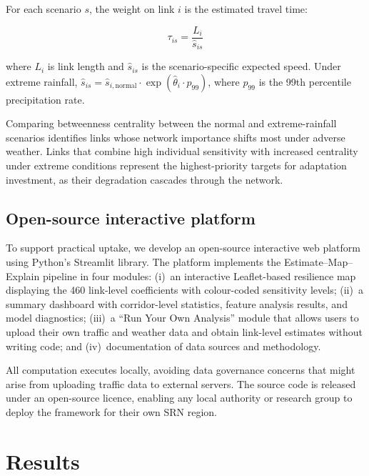 \documentclass[review]{elsarticle}
\begin{document}
For each scenario $s$, the weight on link $i$ is the estimated travel time:

\begin{equation}
\label{eq:traveltime}
\tau_{is} = \frac{L_i}{\hat{s}_{is}}
\end{equation}

\noindent where $L_i$ is link length and $\hat{s}_{is}$ is the scenario-specific expected speed. Under extreme rainfall, $\hat{s}_{is} = \hat{s}_{i,\text{normal}} \cdot \exp(\hat{\theta}_i \cdot p_{99})$, where $p_{99}$ is the 99th percentile precipitation rate.

Comparing betweenness centrality between the normal and extreme-rainfall scenarios identifies links whose network importance shifts most under adverse weather. Links that combine high individual sensitivity with increased centrality under extreme conditions represent the highest-priority targets for adaptation investment, as their degradation cascades through the network.


\subsection{Open-source interactive platform}
\label{sec:method:platform}

To support practical uptake, we develop an open-source interactive web platform using Python's Streamlit library. The platform implements the Estimate--Map--Explain pipeline in four modules: (i)~an interactive Leaflet-based resilience map displaying the 460 link-level coefficients with colour-coded sensitivity levels; (ii)~a summary dashboard with corridor-level statistics, feature analysis results, and model diagnostics; (iii)~a ``Run Your Own Analysis'' module that allows users to upload their own traffic and weather data and obtain link-level estimates without writing code; and (iv)~documentation of data sources and methodology.

All computation executes locally, avoiding data governance concerns that might arise from uploading traffic data to external servers. The source code is released under an open-source licence, enabling any local authority or research group to deploy the framework for their own SRN region.


\section{Results}
\label{sec:results}
\end{document}
